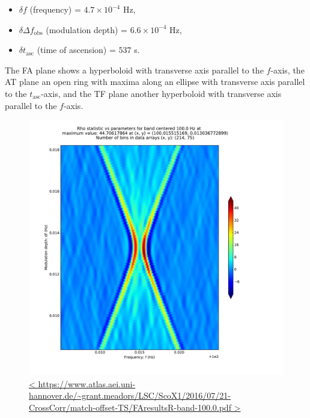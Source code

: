 \documentclass{article}
\begin{document}
\begin{itemize}
    \item $\delta f$ (frequency) = $4.7 \times 10^{-4}$ Hz,
    \item $\delta \Delta f_\mathrm{obs}$ (modulation depth) = $6.6 \times 10^{-4}$ Hz,
    \item $\delta t_\mathrm{asc}$ (time of ascension) = $537$ s.
\end{itemize}

\noindent The FA plane shows a hyperboloid with transverse axis parallel to the $f$-axis, the AT plane an open ring with maxima along an ellipse with transverse axis parallel to the $t_\mathrm{asc}$-axis, and the TF plane another hyperboloid with transverse axis parallel to the $f$-axis.

\begin{figure}
\includegraphics[trim= 0 0 0 0, clip, width=0.80\paperwidth,keepaspectratio]{plots/match-offset-TS/FAresultsR-band-100-0.pdf}
\caption{
\url{<
https://www.atlas.aei.uni-hannover.de/~grant.meadors/LSC/ScoX1/2016/07/21-CrossCorr/match-offset-TS/FAresultsR-band-100.0.pdf
>}
}
\label{FAoffsetGraph}
\end{figure}
\end{document}
